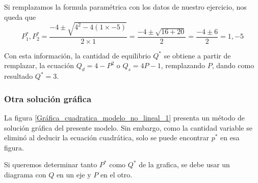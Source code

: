 Si remplazamos la formula paramétrica con los datos de nuestro ejercicio, nos queda que 
\[
P_1^\ast, P_2^\ast = \frac{-4 \pm \sqrt{4^2-4(1\times-5)}}{2\times1} = \frac{-4 \pm \sqrt{16+20}}{2} = \frac{-4 \pm 6}{2} = 1, -5
\]

Con esta información, la cantidad de equilibrio \(Q^\ast\) se obtiene a partir de remplazar, la ecuación \(Q_d = 4-P^2\) o \(Q_s = 4P-1\), remplazando \(P\), dando como resultado \(Q^\ast = 3\).



\subsubsection{Otra solución gráfica}

La figura \ref{Gráfica_cuadratica_modelo_no_lineal_1} presenta un método de solución gráfica del presente modelo. Sin embargo, como la cantidad variable se eliminó al deducir la ecuación cuadrática, solo se puede encontrar \(p^\ast\) en esa figura.

Si queremos determinar tanto \(P^\ast\) como \(Q^\ast\) de la grafica, se debe usar un diagrama con \(Q\) en un eje y \(P\) en el otro.

